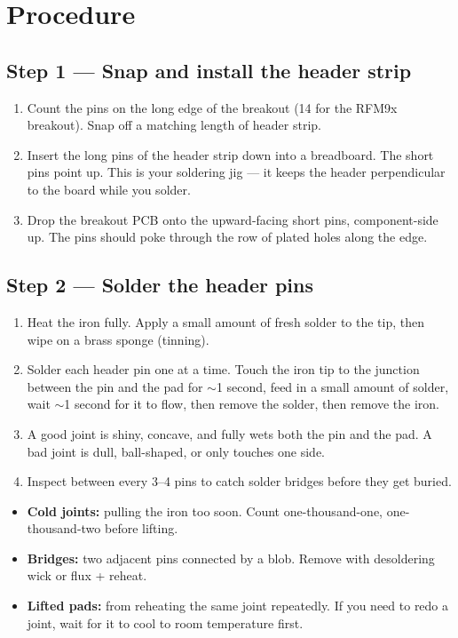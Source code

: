 \documentclass[11pt,letterpaper]{article}
\begin{document}
\newpage
\section{Procedure}

\subsection{Step 1 --- Snap and install the header strip}
\begin{enumerate}[leftmargin=2em]
	\item Count the pins on the long edge of the breakout (14 for the RFM9x breakout). Snap off a matching length of header strip.
	\item Insert the long pins of the header strip down into a breadboard. The short pins point up. This is your soldering jig --- it keeps the header perpendicular to the board while you solder.
	\item Drop the breakout PCB onto the upward-facing short pins, component-side up. The pins should poke through the row of plated holes along the edge.
\end{enumerate}


\newpage
\subsection{Step 2 --- Solder the header pins}
\begin{enumerate}[leftmargin=2em]
	\item Heat the iron fully. Apply a small amount of fresh solder to the tip, then wipe on a brass sponge (tinning).
	\item Solder each header pin one at a time. Touch the iron tip to the junction between the pin and the pad for $\sim$1 second, feed in a small amount of solder, wait $\sim$1 second for it to flow, then remove the solder, then remove the iron.
	\item A good joint is shiny, concave, and fully wets both the pin and the pad. A bad joint is dull, ball-shaped, or only touches one side.
	\item Inspect between every 3--4 pins to catch solder bridges before they get buried.
\end{enumerate}

\begin{tcolorbox}[warning={Common Pitfalls}]
	\begin{itemize}[leftmargin=1.2em]
		\item \textbf{Cold joints:} pulling the iron too soon. Count one-thousand-one, one-thousand-two before lifting.
		\item \textbf{Bridges:} two adjacent pins connected by a blob. Remove with desoldering wick or flux + reheat.
		\item \textbf{Lifted pads:} from reheating the same joint repeatedly. If you need to redo a joint, wait for it to cool to room temperature first.
	\end{itemize}
\end{tcolorbox}
\end{document}
